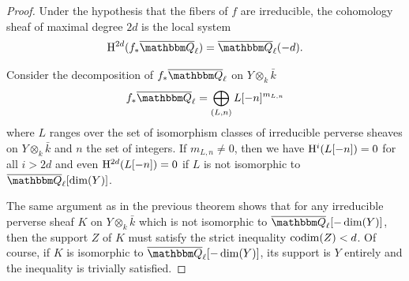 \documentclass[12pt,english]{smfart}
\numberwithin{equation}{subsection}
\theoremstyle{remark}
\newcommand\QQ{{\mathbbm Q}}
\newcommand\rmH{{\rm H}}
\newcommand\Ql{{\overline\QQ_\ell}}
\begin{document}
\begin{proof}
Under the hypothesis that the fibers of $f$ are irreducible, the cohomology
sheaf of maximal degree $2d$ is the local system
$$\rmH^{2d}(f_*\Ql)=\Ql(-d).$$

Consider the decomposition of $f_*\Ql$ on $Y\otimes_k \bar k$
$$f_*\Ql=\bigoplus_{(L,n)} L[-n]^{m_{L,n}}$$
where $L$ ranges over the set of isomorphism classes of irreducible
perverse sheaves on $Y\otimes_k \bar k$ and $n$ the set of
integers. If $m_{L,n}\not=0$, then we have
$\rmH^i(L[-n])=0$ for all $i> 2d$ and even $\rmH^{2d}(L[-n])=0$ if $L$ is not
isomorphic to $\Ql[\dim(Y)]$.

The same argument as in the previous theorem shows that
for any irreducible perverse sheaf $K$ on $Y\otimes_k \bar k$ which
is not isomorphic to $\Ql[-\dim(Y)]$, then the support $Z$ of $K$ must
satisfy the strict inequality ${\rm codim}(Z)<d$. Of course, if $K$ is
isomorphic to $\Ql[-\dim(Y)]$, its support is
$Y$ entirely and the inequality is trivially satisfied.
\end{proof}
\end{document}
